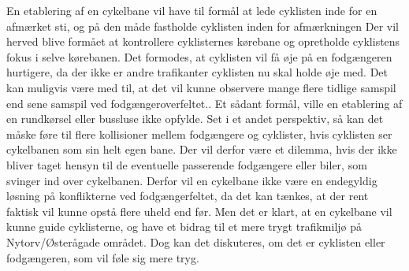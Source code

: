 En etablering af en cykelbane vil have til formål at lede cyklisten inde for en afmærket sti, og på den måde fastholde cyklisten inden for afmærkningen Der vil herved blive formået at kontrollere cyklisternes kørebane og opretholde cyklistens fokus i selve kørebanen. Det formodes, at cyklisten vil få øje på en fodgængeren hurtigere, da der ikke er andre trafikanter cyklisten nu skal holde øje med. Det kan muligvis være med til, at det vil kunne observere mange flere tidlige samspil end sene samspil ved fodgængeroverfeltet.. Et sådant formål, ville en etablering af en rundkørsel eller bussluse ikke opfylde. Set i et andet perspektiv, så kan det måske føre til flere kollisioner mellem fodgængere og cyklister, hvis cyklisten ser cykelbanen som sin helt egen bane. Der vil derfor være et dilemma, hvis der ikke bliver taget hensyn til de eventuelle passerende fodgængere eller biler, som svinger ind over cykelbanen. Derfor vil en cykelbane ikke være en endegyldig løsning på konflikterne ved fodgængerfeltet, da det kan tænkes, at der rent faktisk vil kunne opstå flere uheld end før. Men det er klart, at en cykelbane vil kunne guide cyklisterne, og have et bidrag til et mere trygt trafikmiljø på Nytorv/Østerågade området. Dog kan det diskuteres, om det er cyklisten eller fodgængeren, som vil føle sig mere tryg.
